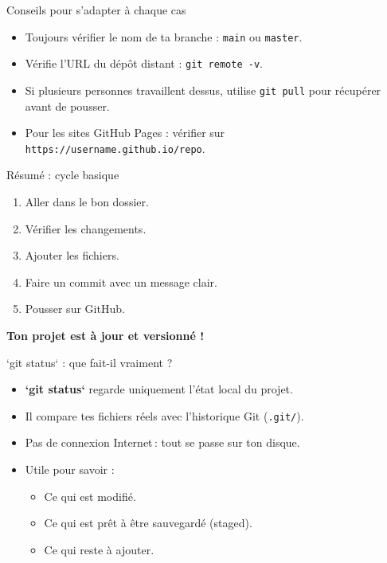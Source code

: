 \documentclass{beamer}
\begin{document}
	\begin{frame}{Conseils pour s’adapter à chaque cas}
		\begin{itemize}
			\item Toujours vérifier le nom de ta branche : \texttt{main} ou \texttt{master}.
			\item Vérifie l’URL du dépôt distant : \texttt{git remote -v}.
			\item Si plusieurs personnes travaillent dessus, utilise \texttt{git pull} pour récupérer avant de pousser.
			\item Pour les sites GitHub Pages : vérifier sur \texttt{https://username.github.io/repo}.
		\end{itemize}
	\end{frame}
	
	\begin{frame}{Résumé : cycle basique}
		\begin{enumerate}
			\item Aller dans le bon dossier.
			\item Vérifier les changements.
			\item Ajouter les fichiers.
			\item Faire un commit avec un message clair.
			\item Pousser sur GitHub.
		\end{enumerate}
		\vspace{1em}
		\textbf{Ton projet est à jour et versionné !}
	\end{frame}


\begin{frame}{`git status` : que fait-il vraiment ?}
	\begin{itemize}
		\item \textbf{`git status`} regarde uniquement l’état local du projet.
		\item Il compare tes fichiers réels avec l’historique Git (\texttt{.git/}).
		\item Pas de connexion Internet : tout se passe sur ton disque.
		\item Utile pour savoir :
		\begin{itemize}
			\item Ce qui est modifié.
			\item Ce qui est prêt à être sauvegardé (staged).
			\item Ce qui reste à ajouter.
		\end{itemize}
	\end{itemize}
\end{frame}
\end{document}
